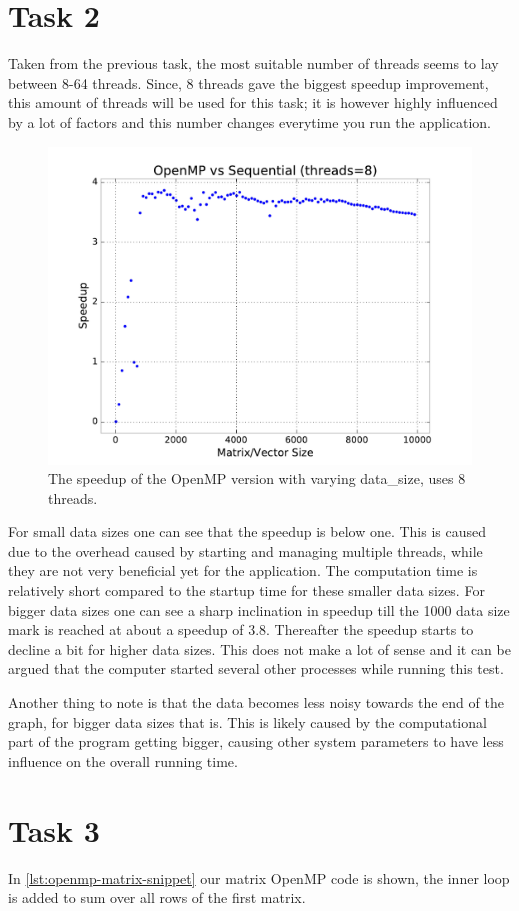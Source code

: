 \documentclass[final]{report}
\begin{document}
\section{Task 2}
Taken from the previous task, the most suitable number of threads seems to lay between 8-64 threads.
Since, 8 threads gave the biggest speedup improvement, this amount of threads will be used for this task; it is however highly influenced by a lot of factors and this number changes everytime you run the application.

\begin{figure}[H]
\centering
    \includegraphics[width=\linewidth]{resources/openmp-data-size-sweep.pdf}
    \caption{The speedup of the OpenMP version with varying data\_size, uses 8 threads.}
    \label{fig:openmp-data-size-sweep}
\end{figure}

For small data sizes one can see that the speedup is below one.
This is caused due to the overhead caused by starting and managing multiple threads, while they are not very beneficial yet for the application.
The computation time is relatively short compared to the startup time for these smaller data sizes. For bigger data sizes one can see a sharp inclination in speedup till the 1000 data size mark is reached at about a speedup of 3.8.
Thereafter the speedup starts to decline a bit for higher data sizes.
This does not make a lot of sense and it can be argued that the computer started several other processes while running this test.

Another thing to note is that the data becomes less noisy towards the end of the graph, for bigger data sizes that is.
This is likely caused by the computational part of the program getting bigger, causing other system parameters to have less influence on the overall running time.

\section{Task 3}
In \cref{lst:openmp-matrix-snippet} our matrix OpenMP code is shown, the inner loop is added to sum over all rows of the first matrix.
\end{document}
